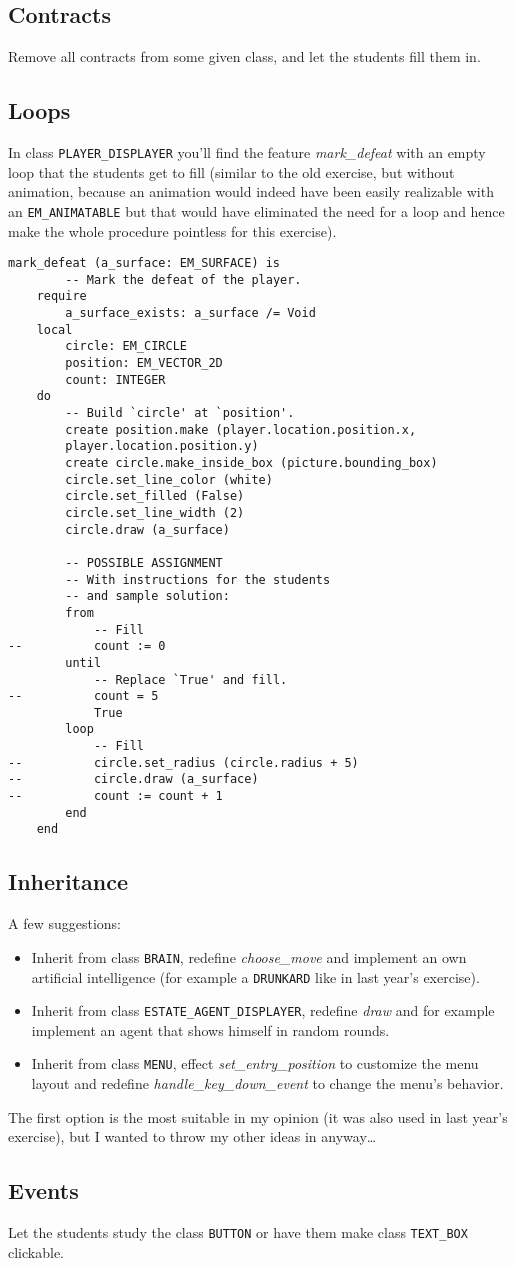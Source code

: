 \subsection{Contracts}
Remove all contracts from some given class, and let the students fill them in.

\subsection{Loops}
In class \texttt{PLAYER\_DISPLAYER} you'll find the feature \textit{mark\_defeat} with an empty loop that the students get to fill (similar to the old exercise, but without animation, because an animation would indeed have been easily realizable with an \texttt{EM\_ANIMATABLE} but that would have eliminated the need for a loop and hence make the whole procedure pointless for this exercise).

\begin{lstlisting}
mark_defeat (a_surface: EM_SURFACE) is  
		-- Mark the defeat of the player.
	require
		a_surface_exists: a_surface /= Void
	local
		circle: EM_CIRCLE
		position: EM_VECTOR_2D
		count: INTEGER
	do
		-- Build `circle' at `position'.
		create position.make (player.location.position.x, 
		player.location.position.y)
		create circle.make_inside_box (picture.bounding_box)
		circle.set_line_color (white)
		circle.set_filled (False)
		circle.set_line_width (2)
		circle.draw (a_surface)

		-- POSSIBLE ASSIGNMENT
		-- With instructions for the students
		-- and sample solution:
		from
			-- Fill
--			count := 0
		until
			-- Replace `True' and fill.
--			count = 5
			True				
		loop
			-- Fill
--			circle.set_radius (circle.radius + 5)
--			circle.draw (a_surface)
--			count := count + 1
		end
	end  
\end{lstlisting}

\subsection{Inheritance}
A few suggestions:

\begin{itemize}
  \item Inherit from class \texttt{BRAIN}, redefine \textit{choose\_move} and implement an own artificial intelligence (for example a \texttt{DRUNKARD} like in last year's exercise). 
  \item Inherit from class \texttt{ESTATE\_AGENT\_DISPLAYER}, redefine \textit{draw} and for example implement an agent that shows himself in random rounds.
  \item Inherit from class \texttt{MENU}, effect \textit{set\_entry\_position} to customize the menu layout and redefine \textit{handle\_key\_down\_event} to change the menu's behavior.
\end{itemize}
The first option is the most suitable in my opinion (it was also used in last year's exercise), but I wanted to throw my other ideas in anyway\ldots

\subsection{Events}
Let the students study the class \texttt{BUTTON} or have them make class \texttt{TEXT\_BOX} clickable.

